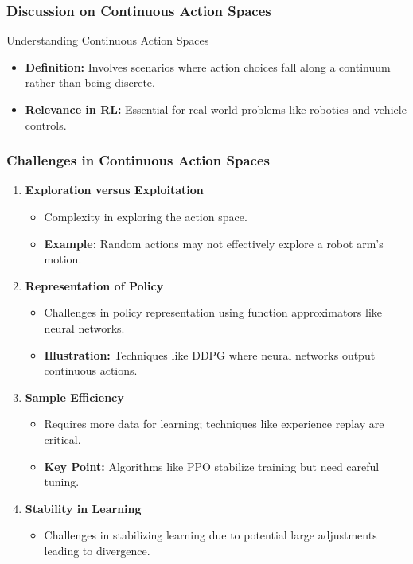 \documentclass[aspectratio=169]{beamer}
\begin{document}
\begin{frame}[fragile]
    \frametitle{Discussion on Continuous Action Spaces}
    \begin{block}{Understanding Continuous Action Spaces}
        \begin{itemize}
            \item \textbf{Definition:} Involves scenarios where action choices fall along a continuum rather than being discrete.
            \item \textbf{Relevance in RL:} Essential for real-world problems like robotics and vehicle controls.
        \end{itemize}
    \end{block}
\end{frame}

\begin{frame}[fragile]
    \frametitle{Challenges in Continuous Action Spaces}
    \begin{enumerate}
        \item \textbf{Exploration versus Exploitation}
            \begin{itemize}
                \item Complexity in exploring the action space.
                \item \textbf{Example:} Random actions may not effectively explore a robot arm's motion.
            \end{itemize}
        
        \item \textbf{Representation of Policy}
            \begin{itemize}
                \item Challenges in policy representation using function approximators like neural networks.
                \item \textbf{Illustration:} Techniques like DDPG where neural networks output continuous actions.
            \end{itemize}
        
        \item \textbf{Sample Efficiency}
            \begin{itemize}
                \item Requires more data for learning; techniques like experience replay are critical.
                \item \textbf{Key Point:} Algorithms like PPO stabilize training but need careful tuning.
            \end{itemize}
        
        \item \textbf{Stability in Learning}
            \begin{itemize}
                \item Challenges in stabilizing learning due to potential large adjustments leading to divergence.
            \end{itemize}
    \end{enumerate}
\end{frame}
\end{document}
